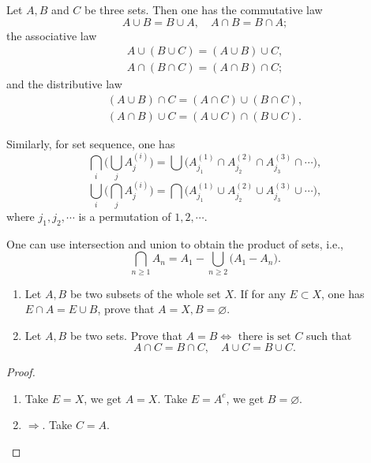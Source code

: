 \documentclass[11pt,singlecolumn, openany, citestyle=authoryear]{elegantbook}
\begin{document}
\begin{CJK}{UTF8}{gbsn}
    \begin{theorem}
        Let $A,B$ and $C$ be three sets. Then one has the commutative law
    \begin{equation}
    A \cup B = B \cup A, \quad A \cap B = B \cap A; 
    \end{equation}
    the associative law 
    \begin{equation}
        \begin{gathered}
            A \cup (B \cup C) = (A \cup B)\cup C,\\
            A \cap (B \cap C) = (A \cap B)\cap C;
        \end{gathered}
    \end{equation}
    and the distributive law 
        \begin{equation}
            \begin{gathered}
            (A \cup B)\cap C = (A \cap C) \cup (B \cap C),\\
            (A \cap B)\cup C = (A \cup C) \cap (B \cup C).
            \end{gathered}
        \end{equation}
    \end{theorem}
    Similarly, for set sequence, one has
    $$
    \bigcap_i\big(\bigcup_j A_j^{(i)}\big) = 
    \bigcup \big(A_{j_1}^{(1)}\cap A_{j_2}^{(2)}\cap A_{j_3}^{(3)}\cap \cdots\big),
    $$
    $$
    \bigcup_i\big(\bigcap_j A_j^{(i)}\big) = 
    \bigcap \big(A_{j_1}^{(1)}\cup A_{j_2}^{(2)}\cup A_{j_3}^{(3)}\cup \cdots\big),
    $$
    where $j_1,j_2,\cdots$ is a permutation of $1,2,\cdots$.
    
    \begin{theorem}One can use intersection and union to obtain the product of sets, i.e., 
        \begin{equation}
        \bigcap_{n \geq 1}A_n = A_1 - \bigcup_{n \geq 2}\big(A_1-A_n\big).
        \end{equation}
    \end{theorem}
    
    \begin{exercise}
    \begin{enumerate}
        \item Let $A,B$ be two subsets of the whole set $X$. If for any $E \subset X$, one 
        has $E\cap A = E \cup B$, prove that $A=X, B = \varnothing$.
        \item Let $A,B$ be two sets. Prove that 
        $A=B \iff \text{ there is set } C$ such that
        $$
        A \cap C = B \cap C, \quad 
        A \cup C = B \cup C.
        $$
    \end{enumerate}
    \end{exercise}
    \begin{proof}
        \begin{enumerate}
            \item Take $E = X$, we get $A=X$. Take $E=A^c$, we get $B = \varnothing$.
            \item 
            $\Longrightarrow$. Take $C=A$.
            

\end{enumerate}
\end{proof}
\end{CJK}
\end{document}
